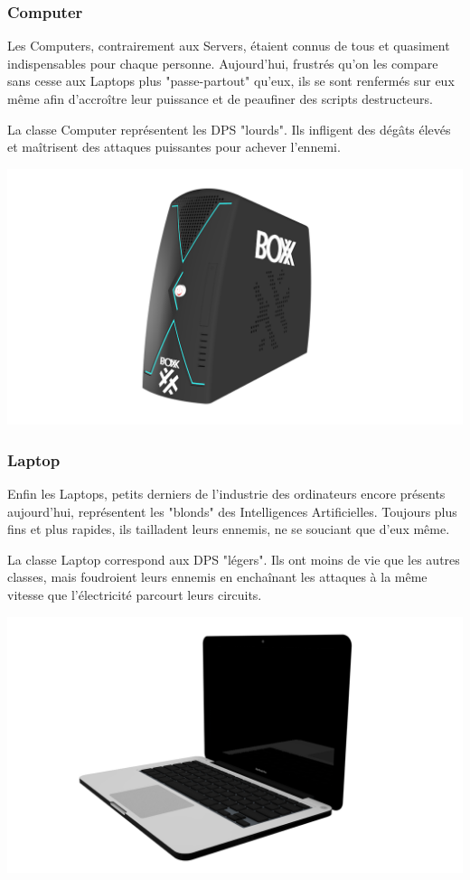 \documentclass[A4paper,11pt]{article}
\begin{document}
\subsubsection{Computer}
Les Computers, contrairement aux Servers, \'etaient connus de tous et quasiment indispensables pour chaque personne. Aujourd'hui, frustr\'es qu'on les compare sans cesse aux Laptops plus "passe-partout" qu'eux, ils se sont renferm\'es sur eux m\^eme afin d'accro\^itre leur puissance et de peaufiner des scripts destructeurs.

La classe Computer repr\'esentent les DPS "lourds". Ils infligent des d\'eg\^ats \'elev\'es et ma\^itrisent des attaques puissantes pour achever l'ennemi.
\begin{center}
\includegraphics[scale=0.2]{computer.png}
\end{center}
\subsubsection{Laptop}
Enfin les Laptops, petits derniers de l'industrie des ordinateurs encore pr\'esents aujourd'hui, repr\'esentent les "blonds" des Intelligences Artificielles. Toujours plus fins et plus rapides, ils tailladent leurs ennemis, ne se souciant que d'eux m\^eme.

La classe Laptop correspond aux DPS "l\'egers". Ils ont moins de vie que les autres classes, mais foudroient leurs ennemis en encha\^inant les attaques \`a la m\^eme vitesse que l'\'electricit\'e parcourt leurs circuits.
\begin{center}
\includegraphics[scale=0.2]{laptop.png}
\end{center}
\newpage
\end{document}
